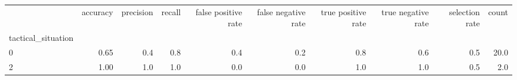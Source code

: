 \begin{tabular}{lrrrrrrrrr}
\toprule
{} &  accuracy &  precision &  recall &  false positive rate &  false negative rate &  true positive rate &  true negative rate &  selection rate &  count \\
tactical\_situation &           &            &         &                      &                      &                     &                     &                 &        \\
\midrule
0                  &      0.65 &        0.4 &     0.8 &                  0.4 &                  0.2 &                 0.8 &                 0.6 &             0.5 &   20.0 \\
2                  &      1.00 &        1.0 &     1.0 &                  0.0 &                  0.0 &                 1.0 &                 1.0 &             0.5 &    2.0 \\
\bottomrule
\end{tabular}
